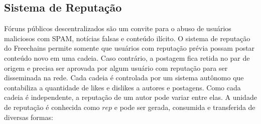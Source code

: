 \documentclass[12pt]{article}
\newcommand{\FC} {Freechains\xspace}
\begin{document}
\subsection{Sistema de Reputação}
\label{sec.freechains.reps}

Fóruns públicos descentralizados são um convite para o abuso de usuários
maliciosos com SPAM, notícias falsas e conteúdo ilícito.
O sistema de reputação do \FC permite somente que usuários com reputação prévia
possam postar conteúdo novo em uma cadeia.
Caso contrário, a postagem fica retida no par de origem e precisa ser aprovada
por algum usuário com reputação para ser disseminada na rede.
Cada cadeia é controlada por um sistema autônomo que contabiliza a quantidade
de likes e dislikes a autores e postagens.
Como cada cadeia é independente, a reputação de um autor pode variar entre
elas.
A unidade de reputação é conhecida como $rep$ e pode ser gerada, consumida e
transferida de diversas formas:
%
\end{document}
